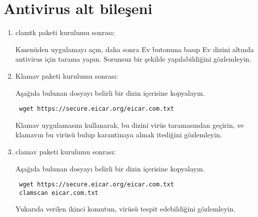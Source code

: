 \documentclass[a4paper,10pt]{article}
\begin{document}
\section{Antivirus alt bileşeni}
\begin{enumerate}
\item clamtk paketi kurulumu sonrası:

Kmenüden uygulamayı açın, daha sonra Ev butonuna basıp Ev dizini altında antivirus için tarama yapın.
Sorunsuz bir şekilde yapılabildiğini gözlemleyin.

\item Klamav paketi kurulumu sonrası:

Aşağıda bulunan dosyayı belirli bir dizin içerisine kopyalayın. 
\begin{verbatim}
 wget https://secure.eicar.org/eicar.com.txt
\end{verbatim}

Klamav uygulamasını kullanarak, bu dizini virüs taramasından geçirin, ve klamavın bu virüsü bulup karantinaya almak itediğini gözlemleyin.

\item clamav paketi kurulumu sonrası:

Aşağıda bulunan dosyayı belirli bir dizin içerisine kopyalayın. 
\begin{verbatim}
 wget https://secure.eicar.org/eicar.com.txt
 clamscan eicar.com.txt
\end{verbatim}

Yukarıda verilen ikinci komutun, virüsü tespit edebildiğini gözlemleyin.

\end{enumerate}
\end{document}
